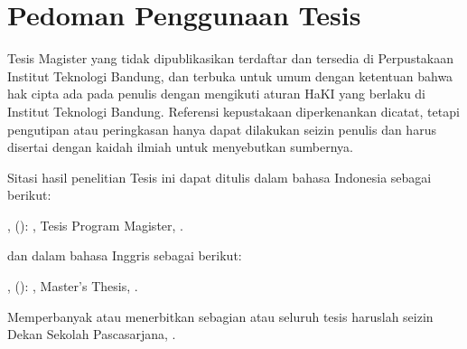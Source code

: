 \chapter*{Pedoman Penggunaan Tesis}

Tesis Magister yang tidak dipublikasikan terdaftar dan tersedia di Perpustakaan Institut Teknologi Bandung, dan terbuka untuk umum dengan ketentuan bahwa hak cipta ada pada penulis dengan mengikuti aturan HaKI yang berlaku di Institut Teknologi Bandung. Referensi kepustakaan diperkenankan dicatat, tetapi pengutipan atau peringkasan hanya dapat dilakukan seizin penulis dan harus disertai dengan kaidah ilmiah untuk menyebutkan sumbernya.

Sitasi hasil penelitian Tesis ini dapat ditulis dalam bahasa Indonesia sebagai berikut:

\ThesisAuthorFamilyName, \ThesisAuthorGivenInitial{} (\ThesisYear): \textit{\ThesisTitleID}, Tesis Program Magister, \ThesisInstitution.

dan dalam bahasa Inggris sebagai berikut:

\ThesisAuthorFamilyName, \ThesisAuthorGivenInitial{} (\ThesisYear): \textit{\ThesisTitleEN}, Master's Thesis, \ThesisInstitution.

Memperbanyak atau menerbitkan sebagian atau seluruh tesis haruslah seizin Dekan Sekolah Pascasarjana, \ThesisInstitution.
